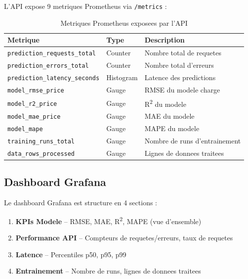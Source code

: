 \documentclass[a4paper,11pt]{article}
\begin{document}
L'API expose 9 metriques Prometheus via \texttt{/metrics} :

\begin{table}[h]
\centering
\small
\begin{tabular}{lll}
\toprule
\textbf{Metrique} & \textbf{Type} & \textbf{Description} \\
\midrule
\texttt{prediction\_requests\_total} & Counter & Nombre total de requetes \\
\texttt{prediction\_errors\_total} & Counter & Nombre total d'erreurs \\
\texttt{prediction\_latency\_seconds} & Histogram & Latence des predictions \\
\texttt{model\_rmse\_price} & Gauge & RMSE du modele charge \\
\texttt{model\_r2\_price} & Gauge & R\textsuperscript{2} du modele \\
\texttt{model\_mae\_price} & Gauge & MAE du modele \\
\texttt{model\_mape} & Gauge & MAPE du modele \\
\texttt{training\_runs\_total} & Gauge & Nombre de runs d'entrainement \\
\texttt{data\_rows\_processed} & Gauge & Lignes de donnees traitees \\
\bottomrule
\end{tabular}
\caption{Metriques Prometheus exposees par l'API}
\end{table}

\subsection{Dashboard Grafana}

Le dashboard Grafana est structure en 4 sections :
\begin{enumerate}
    \item \textbf{KPIs Modele} -- RMSE, MAE, R\textsuperscript{2}, MAPE (vue d'ensemble)
    \item \textbf{Performance API} -- Compteurs de requetes/erreurs, taux de requetes
    \item \textbf{Latence} -- Percentiles p50, p95, p99
    \item \textbf{Entrainement} -- Nombre de runs, lignes de donnees traitees
\end{enumerate}

\end{document}

